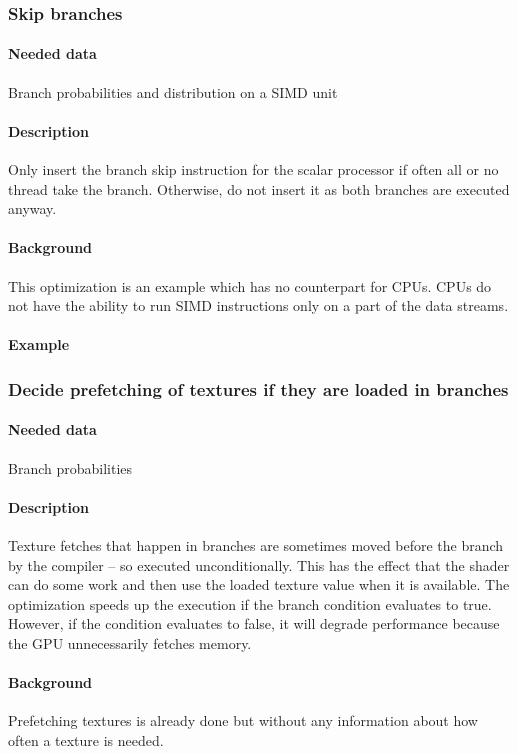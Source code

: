\subsubsection{Skip branches}
\paragraph{Needed data} Branch probabilities and distribution on a SIMD unit
\paragraph{Description} Only insert the branch skip instruction for the scalar processor if often all or no thread take the branch. Otherwise, do not insert it as both branches are executed anyway.
\paragraph{Background} This optimization is an example which has no counterpart for CPUs. CPUs do not have the ability to run SIMD instructions only on a part of the data streams.
\paragraph{Example}
	
\subsubsection{Decide prefetching of textures if they are loaded in branches}
\paragraph{Needed data} Branch probabilities
\paragraph{Description} Texture fetches that happen in branches are sometimes moved before the branch by the compiler -- so executed unconditionally. This has the effect that the shader can do some work and then use the loaded texture value when it is available. The optimization speeds up the execution if the branch condition evaluates to true. However, if the condition evaluates to false, it will degrade performance because the GPU unnecessarily fetches memory.
\paragraph{Background} Prefetching textures is already done but without any information about how often a texture is needed.
